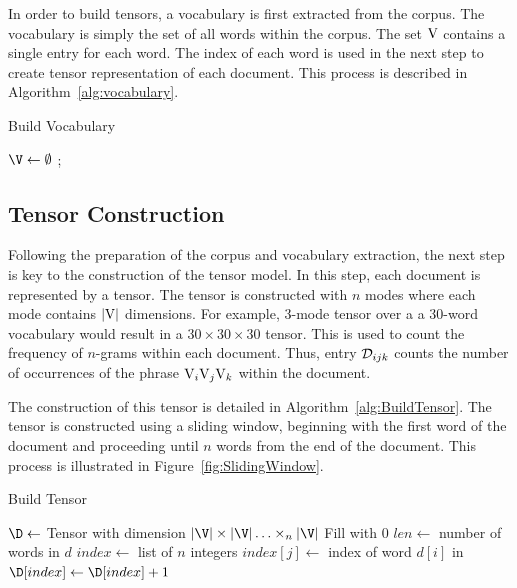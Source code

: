\documentclass[../ut-dissertation.tex]{subfiles}
\begin{document}
In order to build tensors, a vocabulary is first extracted from the
corpus.  The vocabulary is simply the set of all words within the
corpus. The set $\mathrm{V}$ contains a single entry for each word.  The
index of each word is used in the next step to create tensor
representation of each document. This process is described in
Algorithm~\ref{alg:vocabulary}.
\begin{algorithm}
  \caption{Build Vocabulary}
  \label{alg:vocabulary}
  \Output{\V}
  \BlankLine
  $\V\leftarrow\emptyset$\;
  \Return{\V};
\end{algorithm}

\subsection{Tensor Construction}
Following the preparation of the corpus and vocabulary extraction, the
next step is key to the construction of the tensor model.  In this
step, each document is represented by a tensor.  The tensor is
constructed with $n$ modes where each mode contains $|\mathrm{V}|$
dimensions.  For example, 3-mode tensor over a a 30-word vocabulary
would result in a $30 \times 30 \times 30$ tensor. This is used to
count the frequency of $n$-grams within each document.  Thus, entry
$\mathcal{D}_{ijk}$ counts the number of occurrences of the phrase
$\mathrm{V}_i \mathrm{V}_j \mathrm{V}_k$ within the document.


The construction of this tensor is detailed in
Algorithm~\ref{alg:BuildTensor}.  The tensor is constructed using a
sliding window, beginning with the first word of the document
and proceeding until $n$ words from the end of the document.  This
process is illustrated in Figure~\ref{fig:SlidingWindow}.
\begin{algorithm}
  \caption{Build Tensor}
  \label{alg:BuildTensor}
    
  
  \Output{\D}
  \BlankLine
  $\D \leftarrow $ Tensor with dimension $|\V| \times |\V| \ldots
  \times_n |\V|$\;
  Fill \D with 0\;
  $len \leftarrow$ number of words in $d$\;
   {
    $index \leftarrow$ list of $n$ integers\;
     {
      $index[j] \leftarrow$ index of word $d[i]$ in \V\;
    }
    $\D[index] \leftarrow \D[index] + 1$\;
  }
  \Return{\D}
\end{algorithm}
\end{document}
